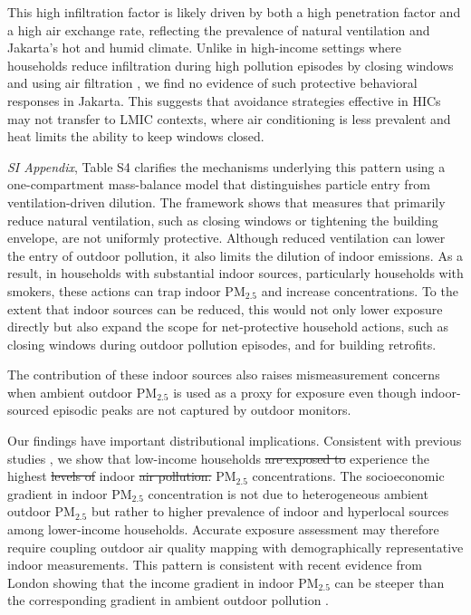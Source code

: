 \documentclass[9pt,twocolumn,twoside]{pnas-new}
\providecommand{\DIFadd}[1]{{\protect\color{red}#1}}
\providecommand{\DIFdel}[1]{{\protect\color{red}\protect\sout{#1}}}
\begin{document}
This high infiltration factor is likely driven by both a high penetration factor and a high air exchange rate, reflecting the prevalence of natural ventilation and Jakarta's hot and humid climate. Unlike in high-income settings where households reduce infiltration during high pollution episodes by closing windows and using air filtration \citep{burke_exposures_2022}, we find no evidence of such protective behavioral responses in Jakarta. This suggests that avoidance strategies effective in HICs may not transfer to LMIC contexts, where air conditioning is less prevalent and heat limits the ability to keep windows closed.

\textit{SI Appendix}, Table S4 clarifies the mechanisms underlying this pattern using a one-compartment mass-balance model that distinguishes particle entry from ventilation-driven dilution. The framework shows that measures that primarily reduce natural ventilation, such as closing windows or tightening the building envelope, are not uniformly protective. Although reduced ventilation can lower the entry of outdoor pollution, it also limits the dilution of indoor emissions. As a result, in households with substantial indoor sources, particularly households with smokers, these actions can trap indoor PM$_{2.5}$ and increase concentrations. To the extent that indoor sources can be reduced, this would not only lower exposure directly but also expand the scope for net-protective household actions, such as closing windows during outdoor pollution episodes, and for building retrofits. 

The contribution of these indoor sources also raises mismeasurement concerns when ambient outdoor PM$_{2.5}$ is used as a proxy for exposure even though indoor-sourced episodic peaks are not captured by outdoor monitors.

Our findings have important distributional implications. Consistent with previous studies \citep{greenstone_indoor_2021, burke_exposures_2022, ito_willingness_2020}, we show that low-income households \DIFdel{are exposed to} \DIFadd{experience} the highest \DIFdel{levels of} indoor \DIFdel{air pollution.} \DIFadd{PM$_{2.5}$ concentrations.} 
The socioeconomic gradient in indoor PM$_{2.5}$ concentration is not due to heterogeneous ambient outdoor PM$_{2.5}$ but rather to higher prevalence of indoor and hyperlocal sources among lower-income households. Accurate exposure assessment may therefore require coupling outdoor air quality mapping with demographically representative indoor measurements. This pattern is consistent with recent evidence from London showing that the income gradient in indoor PM$_{2.5}$ can be steeper than the corresponding gradient in ambient outdoor pollution \citep{metcalfe_making_2025}.
\end{document}
